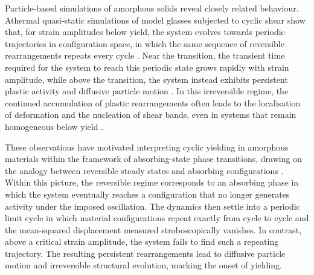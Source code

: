 \documentclass[asymmetricmargins]{library/duthesis}%
\providecommand{\DIFaddend}{} %
\begin{document}
\DIFaddend Particle-based simulations of amorphous solids reveal closely related behaviour. Athermal quasi-static simulations of model glasses subjected to cyclic shear show that, for strain amplitudes below yield, the system evolves towards periodic trajectories in configuration space, in which the same sequence of reversible rearrangements repeats every cycle \cite{Fiocco2013,Regev_onset_2013,Leishangthem2017,nessAbsorbingStateTransitionsGranular2020}. Near the transition, the transient time required for the system to reach this periodic state grows rapidly with strain amplitude, while above the transition, the system instead exhibits persistent plastic activity and diffusive particle motion \cite{Regev_onset_2013,kawasakiMacroscopicYieldingJammed2016}. In this irreversible regime, the continued accumulation of plastic rearrangements often leads to the localisation of deformation and the nucleation of shear bands, even in systems that remain homogeneous below yield \cite{Leishangthem2017,bhaumikRoleAnnealingDetermining2021}.

These observations have motivated interpreting cyclic yielding in amorphous materials within the framework of absorbing-state phase transitions, drawing on the analogy between reversible steady states and absorbing configurations \cite{nessAbsorbingStateTransitionsGranular2020,Cort2008,himanagamanasaExperimentalSignaturesNonequilibrium2014}. Within this picture, the reversible regime corresponds to an absorbing phase in which the system eventually reaches a configuration that no longer generates activity under the imposed oscillation. The dynamics then settle into a periodic limit cycle in which material configurations repeat exactly from cycle to cycle and the mean-squared displacement measured stroboscopically vanishes. In contrast, above a critical strain amplitude, the system fails to find such a repeating trajectory. The resulting persistent rearrangements lead to diffusive particle motion and irreversible structural evolution, marking the onset of yielding. 
\end{document}
